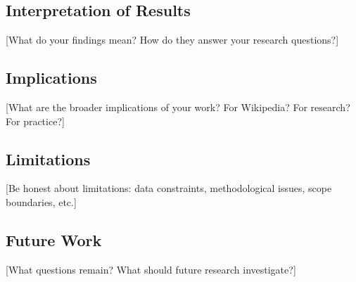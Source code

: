 
\label{sec:discussion}

\subsection{Interpretation of Results}

[What do your findings mean? How do they answer your research questions?]

\subsection{Implications}

[What are the broader implications of your work? For Wikipedia? For research? For practice?]

\subsection{Limitations}

[Be honest about limitations: data constraints, methodological issues, scope boundaries, etc.]

\subsection{Future Work}

[What questions remain? What should future research investigate?]

